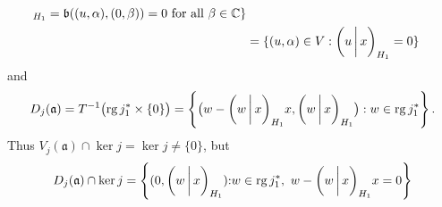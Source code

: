 \documentclass[a4paper,oneside,12pt]{amsart}
\theoremstyle{plain}
\theoremstyle{definition}
\newenvironment{example}
{\pushQED{\qed}

\examplex}
{\popQED\endexamplex}
\begin{document}
\begin{example}
\begin{align*}
{{\ifthenelse{\equal{auto}{B}}{\Bigl({u}\mkern3mu{\bigm|}\mkern3mu {\beta x}\Bigr)}{}
}}_{H_1}={{\mathfrak{{b}}}}((u,\alpha),(0,\beta))=0\text{ for all $\beta\in{\mathbb{C}}$}\} \\
    &=\{(u,\alpha)\in V: {{\ifthenelse{\equal{auto}{auto}}{\left({u}\mkern3mu{\biggm|}\mkern3mu {x}\right)}{}
\ifthenelse{\equal{auto}{b}}{\bigl({u}\mkern3mu{\biggm|}\mkern3mu {x}\bigr)}{}
\ifthenelse{\equal{auto}{B}}{\Bigl({u}\mkern3mu{\bigm|}\mkern3mu {x}\Bigr)}{}
}}_{H_1}=0\}
\end{align*}
and
\begin{align*}
    D_j({{\mathfrak{{a}}}}) = T^{-1}\bigl(\operatorname{rg} j_1^*\times\{0\}\bigr) 
    = \left\{\bigl(w - {{\ifthenelse{\equal{auto}{auto}}{\left({w}\mkern3mu{\biggm|}\mkern3mu {x}\right)}{}
\ifthenelse{\equal{auto}{b}}{\bigl({w}\mkern3mu{\biggm|}\mkern3mu {x}\bigr)}{}
\ifthenelse{\equal{auto}{B}}{\Bigl({w}\mkern3mu{\bigm|}\mkern3mu {x}\Bigr)}{}
}}_{H_1}x, {{\ifthenelse{\equal{auto}{auto}}{\left({w}\mkern3mu{\biggm|}\mkern3mu {x}\right)}{}
\ifthenelse{\equal{auto}{b}}{\bigl({w}\mkern3mu{\biggm|}\mkern3mu {x}\bigr)}{}
\ifthenelse{\equal{auto}{B}}{\Bigl({w}\mkern3mu{\bigm|}\mkern3mu {x}\Bigr)}{}
}}_{H_1}\bigr): w\in\operatorname{rg} j_1^* \right\}.
\end{align*}
Thus $V_j({{\mathfrak{{a}}}})\cap\ker j=\ker j\ne\{0\}$, but 
\[
    D_j({{\mathfrak{{a}}}})\cap\ker j={{\ifthenelse{\equal{auto}{auto}}{\left\{{(0,{{\ifthenelse{\equal{auto}{auto}}{\left({w}\mkern3mu{\biggm|}\mkern3mu {x}\right)}{}
\ifthenelse{\equal{auto}{b}}{\bigl({w}\mkern3mu{\biggm|}\mkern3mu {x}\bigr)}{}
\ifthenelse{\equal{auto}{B}}{\Bigl({w}\mkern3mu{\bigm|}\mkern3mu {x}\Bigr)}{}
}}_{H_1})}{:} {w\in\operatorname{rg} j_1^*,\ w-{{\ifthenelse{\equal{auto}{auto}}{\left({w}\mkern3mu{\biggm|}\mkern3mu {x}\right)}{}
\ifthenelse{\equal{auto}{b}}{\bigl({w}\mkern3mu{\biggm|}\mkern3mu {x}\bigr)}{}
\ifthenelse{\equal{auto}{B}}{\Bigl({w}\mkern3mu{\bigm|}\mkern3mu {x}\Bigr)}{}
}}_{H_1}x=0}\right\}}{}
\ifthenelse{\equal{auto}{b}}{\bigl\{{(0,{{\ifthenelse{\equal{auto}{auto}}{\left({w}\mkern3mu{\biggm|}\mkern3mu {x}\right)}{}
\ifthenelse{\equal{auto}{b}}{\bigl({w}\mkern3mu{\biggm|}\mkern3mu {x}\bigr)}{}
\ifthenelse{\equal{auto}{B}}{\Bigl({w}\mkern3mu{\bigm|}\mkern3mu {x}\Bigr)}{}
}}_{H_1})}{:} {w\in\operatorname{rg} j_1^*,\ w-{{\ifthenelse{\equal{auto}{auto}}{\left({w}\mkern3mu{\biggm|}\mkern3mu {x}\right)}{}
\ifthenelse{\equal{auto}{b}}{\bigl({w}\mkern3mu{\biggm|}\mkern3mu {x}\bigr)}{}
\ifthenelse{\equal{auto}{B}}{\Bigl({w}\mkern3mu{\bigm|}\mkern3mu {x}\Bigr)}{}
}}_{H_1}x=0}\bigr\}}{}
}}\]
\end{example}
\end{document}
